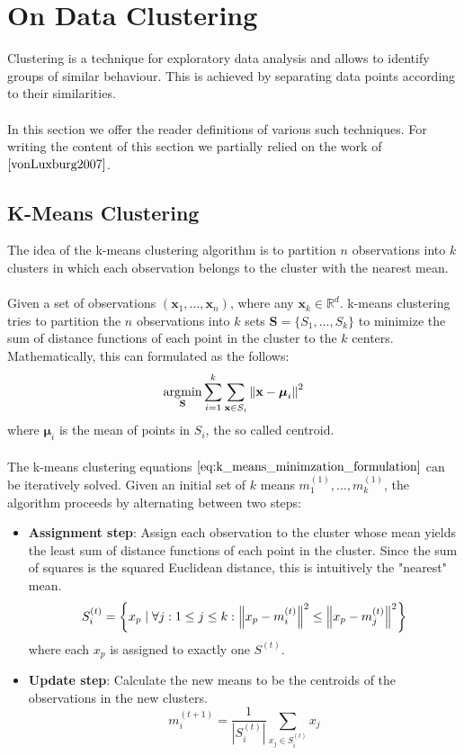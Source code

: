 \section{On Data Clustering}
Clustering is a technique for exploratory data analysis and allows to identify groups of similar behaviour. This is achieved by separating data points according to their similarities. \\ \\
In this section we offer the reader definitions of various such techniques. For writing the content of this section we partially relied on the work of $\cite{vonLuxburg2007}$.

\subsection{K-Means Clustering}
\label{sec:k_means}
The idea of the k-means clustering algorithm is to partition $n$ observations into $k$ clusters in which each observation belongs to the cluster with the nearest mean. \\ \\
Given a set of observations $(\textbf{x}_1, \dots, \textbf{x}_n)$, where any $\textbf{x}_k \in \mathbb{R}^d$. k-means clustering tries to partition the $n$ observations into $k$ sets $\textbf{S} = \{ S_1, \dots, S_k\}$ to minimize the sum of distance functions of each point in the cluster to the $k$ centers. Mathematically, this can formulated as the follows:
\begin{equation}
	\operatorname*{\arg\!\min}_{\textbf{S}} \sum_{i=1}^k \sum_{\textbf{x} \in S_i} \left\lVert\textbf{x} - {\boldsymbol {\mu }}_{i}\right\rVert^2
\label{eq:k_means_minimzation_formulation}
\end{equation}
where ${\boldsymbol {\mu }}_{i}$ is the mean of points in $S_i$, the so called centroid. \\ \\
The k-means clustering equations $\ref{eq:k_means_minimzation_formulation}$ can be iteratively solved. Given an initial set of $k$ means $m_1^{(1)}, \dots, m_k^{(1)}$, the algorithm proceeds by alternating between two steps:
\begin{itemize}
\item \textbf{Assignment step}: Assign each observation to the cluster whose mean yields the least sum of distance functions of each point in the cluster. Since the sum of squares is the squared Euclidean distance, this is intuitively the "nearest" mean. 
\begin{equation}
  	S_i^{(t)} = \left\{ x_p \mid \forall j: 1 \leq j \leq k: \left\lVert x_p - m_i^{(t)}\right\rVert^2 \leq \left\lVert x_p - m_j^{(t)}\right\rVert^2 \right\}
\end{equation} 
where each $x_p$ is assigned to exactly one $S^{(t)}$.
\item \textbf{Update step}: Calculate the new means to be the centroids of the observations in the new clusters. 
\begin{equation}
	m_i^{(t+1)} = \frac{1}{\left| S_i^{(t)} \right| } \sum_{x_j \in S_i^{(t)}} x_j
\end{equation}
\end{itemize}
